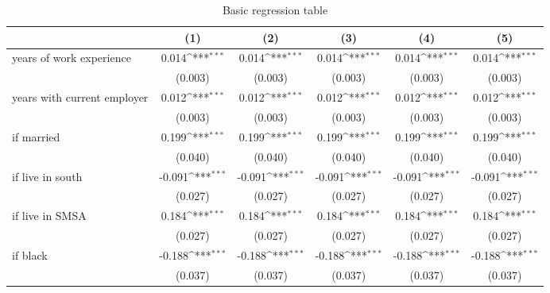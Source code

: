 \begin{table}[htbp]\centering
\def\sym#1{\ifmmode^{#1}\else\(^{#1}\)\fi}
\caption{Basic regression table \label{reg1}}
\begin{tabular}{l*{5}{c}}
\toprule
                    &\multicolumn{1}{c}{(1)}         &\multicolumn{1}{c}{(2)}         &\multicolumn{1}{c}{(3)}         &\multicolumn{1}{c}{(4)}         &\multicolumn{1}{c}{(5)}         \\
\midrule
years of work experience&       0.014\sym{***}&       0.014\sym{***}&       0.014\sym{***}&       0.014\sym{***}&       0.014\sym{***}\\
                    &     (0.003)         &     (0.003)         &     (0.003)         &     (0.003)         &     (0.003)         \\
\addlinespace
years with current employer&       0.012\sym{***}&       0.012\sym{***}&       0.012\sym{***}&       0.012\sym{***}&       0.012\sym{***}\\
                    &     (0.003)         &     (0.003)         &     (0.003)         &     (0.003)         &     (0.003)         \\
\addlinespace
=1 if married       &       0.199\sym{***}&       0.199\sym{***}&       0.199\sym{***}&       0.199\sym{***}&       0.199\sym{***}\\
                    &     (0.040)         &     (0.040)         &     (0.040)         &     (0.040)         &     (0.040)         \\
\addlinespace
=1 if live in south &      -0.091\sym{***}&      -0.091\sym{***}&      -0.091\sym{***}&      -0.091\sym{***}&      -0.091\sym{***}\\
                    &     (0.027)         &     (0.027)         &     (0.027)         &     (0.027)         &     (0.027)         \\
\addlinespace
=1 if live in SMSA  &       0.184\sym{***}&       0.184\sym{***}&       0.184\sym{***}&       0.184\sym{***}&       0.184\sym{***}\\
                    &     (0.027)         &     (0.027)         &     (0.027)         &     (0.027)         &     (0.027)         \\
\addlinespace
=1 if black         &      -0.188\sym{***}&      -0.188\sym{***}&      -0.188\sym{***}&      -0.188\sym{***}&      -0.188\sym{***}\\
                    &     (0.037)         &     (0.037)         &     (0.037)         &     (0.037)         &     (0.037)         \\

\end{tabular}
\end{table}
